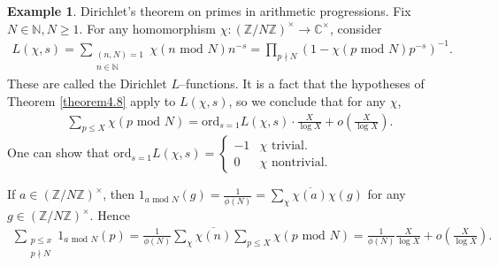 \documentclass{article}
\theoremstyle{definition}
\newtheorem{example}{Example}[section]
\begin{document}
\begin{example}
    Dirichlet's theorem on primes in arithmetic progressions. Fix $N \in \mathbb{N}, N\ge 1$. For any homomorphism $\chi : (\mathbb{Z}/N\mathbb{Z})^\times \to \mathbb{C}^\times$, consider 
    \begin{align*}
        L(\chi, s) = \sum_{\substack{(n,N)=1\\n \in \mathbb{N}}}^{} \chi(n \text{ mod }N)n^{-s} = \prod_{p \nmid N}^{} (1 - \chi(p \text{ mod }N)p^{-s})^{-1}.
    \end{align*}
    These are called the Dirichlet $L$--functions. It is a fact that the hypotheses of Theorem \ref{theorem4.8} apply to $L(\chi, s)$, so we conclude that for any $\chi$, 
    \begin{align*}
        \sum_{p \le X}^{} \chi(p \text{ mod }N) = \text{ord}_{s=1} L(\chi, s) \cdot \frac{X}{\log X} + o \left(\frac{X}{\log X}\right).
    \end{align*}
    One can show that $\text{ord}_{s=1}L(\chi,s) = \begin{cases}
        -1 & \chi \text{ trivial}.\\
        0 & \chi \text{ nontrivial}.
    \end{cases}$ 
    \vspace{1mm}
     
    If $a \in (\mathbb{Z}/N\mathbb{Z})^\times$, then $1_{a \text{ mod }N}(g) = \frac{1}{\phi(N)} = \sum_{\chi}^{} \overline{\chi(a)}\chi(g)$ for any $g \in (\mathbb{Z}/N\mathbb{Z})^\times$. Hence
    \begin{align*}
        \sum_{\substack{p\le x\\p \nmid N}}^{} 1_{a \text{ mod }N}(p) = \frac{1}{\phi(N)} \sum_{\chi}^{} \overline{\chi(n)} \sum_{p\le X}^{} \chi(p \text{ mod }N) = \frac{1}{\phi(N)} \frac{X}{\log X} + o \left(\frac{X}{\log X}\right).
    \end{align*}
\end{example}
\end{document}
